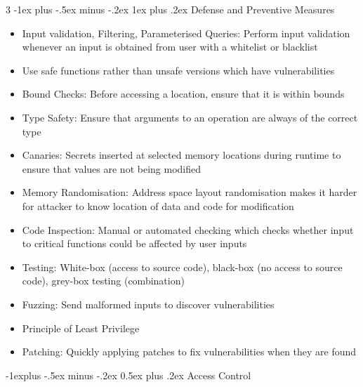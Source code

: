\documentclass[10pt, landscape]{article}
\makeatletter
\renewcommand{\section}{\@startsection{section}{1}{0mm}%
                                {-1ex plus -.5ex minus -.2ex}%
                                {0.5ex plus .2ex}%
                                {\normalfont\large\bfseries}}
\renewcommand{\section}{\@startsection{section}{2}{0mm}%
                                {-1explus -.5ex minus -.2ex}%
                                {0.5ex plus .2ex}%
                                {\normalfont\normalsize\bfseries}}
\renewcommand{\subsection}{\@startsection{subsection}{3}{0mm}%
                                {-1ex plus -.5ex minus -.2ex}%
                                {1ex plus .2ex}%
                                {\normalfont\small\bfseries}}%
\makeatother
\begin{document}
\begin{multicols*}{3}
\subsection{Defense and Preventive Measures}
\begin{itemize}
    \item Input validation, Filtering, Parameterised Queries: Perform input validation whenever an input is obtained from user with a whitelist or blacklist
    \item Use safe functions rather than unsafe versions which have vulnerabilities
    \item Bound Checks: Before accessing a location, ensure that it is within bounds
    \item Type Safety: Ensure that arguments to an operation are always of the correct type
    \item Canaries: Secrets inserted at selected memory locations during runtime to ensure that values are not being modified
    \item Memory Randomisation: Address space layout randomisation makes it harder for attacker to know location of data and code for modification
    \item Code Inspection: Manual or automated checking which checks whether input to critical functions could be affected by user inputs
    \item Testing: White-box (access to source code), black-box (no access to source code), grey-box testing (combination)
    \item Fuzzing: Send malformed inputs to discover vulnerabilities
    \item Principle of Least Privilege
    \item Patching: Quickly applying patches to fix vulnerabilities when they are found
\end{itemize}

\section{Access Control}

\end{multicols*}
\end{document}
